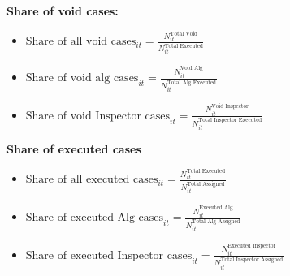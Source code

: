 \documentclass{article}
\newcommand{\OutPath}{Output/}%
\newcommand{\OutPath}{../Output/}%
\begin{document}
\textbf{Share of void cases:}

\begin{itemize}
    \item{$\text{Share of all void cases}_{it} = \frac{N^\text{Total Void}_{it}}{N^{\text{Total Executed}}_{it}}$}

    \item{$\text{Share of void alg cases}_{it} = \frac{N^\text{Void Alg}_{it}}{N^{\text{Total Alg Executed}}_{it}}$}
    
     \item{$\text{Share of void Inspector cases}_{it} = \frac{N^\text{Void Inspector}_{it}}{N^{\text{Total Inspector Executed}}_{it}}$}
\end{itemize}

\textbf{Share of executed cases}
\begin{itemize}
    \item{$\text{Share of all executed cases}_{it} = \frac{N^\text{Total Executed}_{it}}{N^{\text{Total Assigned}}_{it}}$}

     \item{$\text{Share of executed Alg cases}_{it} = \frac{N^\text{Executed Alg}_{it}}{N^{\text{Total Alg Assigned}}_{it}}$}

     \item{$\text{Share of executed Inspector cases}_{it} = \frac{N^\text{Executed Inspector}_{it}}{N^{\text{Total Inspector Assigned}}_{it}}$}
\end{itemize}

\textbf{}

\begin{table}[H]
\caption{Number of inspectors by period and subsample (Desk audits}
    \centering
    \resizebox{\textwidth}{!}{%

    }
\end{table}


\begin{table}[H]
\caption{Number of inspectors that registered execution and void audits by period and sub-sample (Desk audits)}
    \centering
    \resizebox{\textwidth}{!}{%
        
    }
\end{table}

\begin{table}[H]
\caption{Inspector average execution and void case rates by period and sub-sample (Desk audits)}
    \centering
    \resizebox{\textwidth}{!}{%
        
    }
\end{table}
\end{document}
